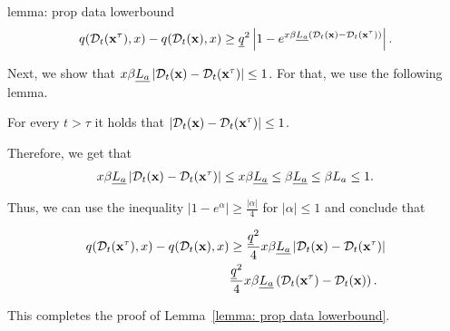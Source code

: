 \begin{proofof}{lemma: prop data lowerbound}
\begin{align*}
q(\mathcal{D}_t({\bf{x}}^\tau), x) - q(\mathcal{D}_t({\bf{x}}), x) \geq \underline{q}^2 \left| 1- e^{x \beta \underline{L_a} \left( \mathcal{D}_t({\bf{x}}) - \mathcal{D}_t({\bf{x}}^\tau) \right)} \right|.
\end{align*}

Next, we show that $x\beta \underline{L_a} \left| \mathcal{D}_t({\bf{x}}) - \mathcal{D}_t({\bf{x}}^\tau) \right| \leq 1$. For that, we use the following lemma.
\begin{lemma} \label{lemma: bounded data at 1}
For every $t > \tau$ it holds that $\left| \mathcal{D}_t({\bf{x}}) - \mathcal{D}_t({\bf{x}}^\tau) \right| \leq 1$.
\end{lemma}

Therefore, we get that
\begin{align*}
x\beta \underline{L_a} \left| \mathcal{D}_t({\bf{x}}) - \mathcal{D}_t({\bf{x}}^\tau) \right| \leq x\beta \underline{L_a} \leq \beta \underline{L_a} \leq \beta L_a \leq 1.
\end{align*}

Thus, we can use the inequality $\left| 1 - e^\alpha \right| \geq \frac{\left|\alpha\right|}{4}$ for $\left| \alpha \right| \leq 1$ and conclude that

\begin{align*}
q(\mathcal{D}_t({\bf{x}}^\tau), x) - q(\mathcal{D}_t({\bf{x}}), x) &\geq \frac{\underline{q}^2}{4} x \beta \underline{L_a} \left| \mathcal{D}_t({\bf{x}}) - \mathcal{D}_t({\bf{x}}^\tau) \right| \\
& \frac{\underline{q}^2}{4} x \beta \underline{L_a} \left( \mathcal{D}_t({\bf{x}}^\tau) - \mathcal{D}_t({\bf{x}}) \right).
\end{align*}

This completes the proof of Lemma~\ref{lemma: prop data lowerbound}.
\end{proofof}

